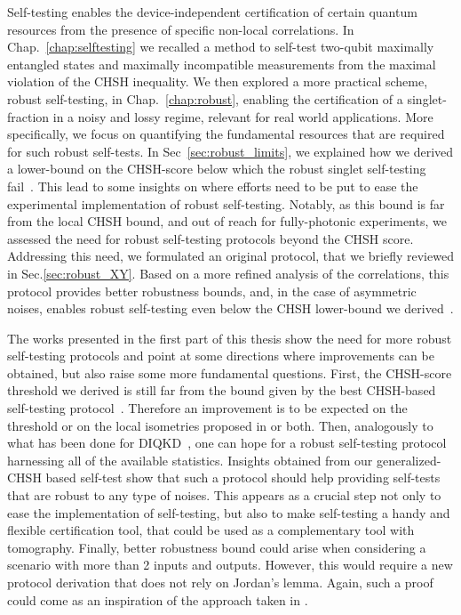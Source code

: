 Self-testing enables the device-independent certification of certain quantum resources from the presence of specific non-local correlations.
In Chap.~\ref{chap:selftesting} we recalled a method to self-test two-qubit maximally entangled states and maximally incompatible measurements from the maximal violation of the CHSH inequality.
We then explored a more practical scheme, robust self-testing, in Chap.~\ref{chap:robust}, enabling the certification of a singlet-fraction in a noisy and lossy regime, relevant for real world applications.
More specifically, we focus on quantifying the fundamental resources that are required for such robust self-tests.
In Sec~\ref{sec:robust_limits}, we explained how we derived a lower-bound on the CHSH-score below which the robust singlet self-testing fail~\cite{Valcarce2020}.
This lead to some insights on where efforts need to be put to ease the experimental implementation of robust self-testing.
Notably, as this bound is far from the local CHSH bound, and out of reach for fully-photonic experiments, we assessed the need for robust self-testing protocols beyond the CHSH score.
Addressing this need, we formulated an original protocol, that we briefly reviewed in Sec.\ref{sec:robust_XY}.
Based on a more refined analysis of the correlations, this protocol provides better robustness bounds, and, in the case of asymmetric noises, enables robust self-testing even below the CHSH lower-bound we derived~\cite{Valcarce2022}.

\medbreak

The works presented in the first part of this thesis show the need for more robust self-testing protocols and point at some directions where improvements can be obtained, but also raise some more fundamental questions.
First, the CHSH-score threshold we derived is still far from the bound given by the best CHSH-based self-testing protocol~\cite{Kaniewski2016}.
Therefore an improvement is to be expected on the threshold or on the local isometries proposed in \cite{Kaniewski2016} or both.
Then, analogously to what has been done for DIQKD~\cite{Brown2021}, one can hope for a robust self-testing protocol harnessing all of the available statistics.
Insights obtained from our generalized-CHSH based self-test show that such a protocol should help providing self-tests that are robust to any type of noises.
This appears as a crucial step not only to ease the implementation of self-testing, but also to make self-testing a handy and flexible certification tool, that could be used as a complementary tool with tomography.
Finally, better robustness bound could arise when considering a scenario with more than 2 inputs and outputs.
However, this would require a new protocol derivation that does not rely on Jordan's lemma.
Again, such a proof could come as an inspiration of the approach taken in \cite{Brown2021}.


